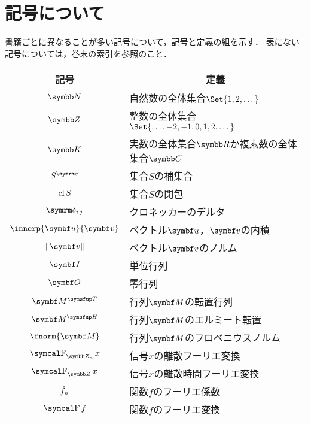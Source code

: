 \documentclass[../../main]{subfiles}
\begin{document}
\chapter{記号について}
\thispagestyle{empty}
書籍ごとに異なることが多い記号について，記号と定義の組を示す．
表にない記号については，巻末の索引を参照のこと．

\vspace*{\fill}
\begin{table*}
  \centering
  \begin{tabular}{c|l} \hline
    記号 & \multicolumn{1}{c}{定義} \\ \hline
    \(\numset{N}\) & 自然数の全体集合\(\Set{1,2,\dotsc}\) \\
    \(\numset{Z}\) & 整数の全体集合\(\Set{\dotsc,-2,-1,0,1,2,\dotsc}\) \\
    \(\numset{K}\) & 実数の全体集合\(\numset{R}\)か複素数の全体集合\(\numset{C}\) \\
    \(\scomp{S}\) & 集合\(S\)の補集合 \\
    \(\operatorname{cl} S\) & 集合\(S\)の閉包 \\
    \(\kdelta{i}{j}\) & クロネッカーのデルタ \\
    \(\innerp{\vect{u}}{\vect{v}}\) & ベクトル\(\vect{u}\)，\(\vect{v}\)の内積 \\
    \(\vnorm{\vect{v}}\) & ベクトル\(\vect{v}\)のノルム \\
    \(\imat\) & 単位行列 \\
    \(\zmat\) & 零行列 \\
    \(\trps{\mat{M}}\) & 行列\(\mat{M}\)の転置行列 \\
    \(\htrps{\mat{M}}\) & 行列\(\mat{M}\)のエルミート転置 \\
    \(\fnorm{\mat{M}}\) & 行列\(\mat{M}\)のフロベニウスノルム \\
    \(\dft{n}x\) & 信号\(x\)の離散フーリエ変換 \\
    \(\dtft x\) & 信号\(x\)の離散時間フーリエ変換 \\
    \(\hat{f}_n\) & 関数\(f\)のフーリエ係数 \\
    \(\ftrans f\) & 関数\(f\)のフーリエ変換 \\ \hline
  \end{tabular}
\end{table*}
\vspace*{\fill}
\end{document}
